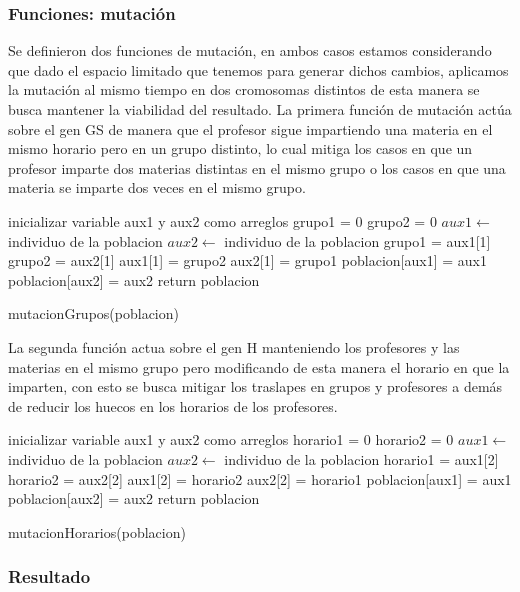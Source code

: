 \subsubsection{Funciones: mutación}

Se definieron dos funciones de mutación, en ambos casos estamos considerando que dado el espacio limitado que tenemos para generar dichos cambios, aplicamos la mutación al mismo tiempo en dos cromosomas distintos de esta manera se busca mantener la viabilidad del resultado. La primera función de mutación  actúa sobre el gen GS de manera que el profesor sigue impartiendo una materia en el mismo horario pero en un grupo distinto, lo cual mitiga los casos en que un profesor imparte dos materias distintas en el mismo grupo o los casos en que una materia se imparte dos veces en el mismo grupo.\\ 


\begin{algorithm}[H]
	\DontPrintSemicolon
	\SetAlgoLined
	inicializar variable aux1 y aux2 como arreglos\;
	grupo1 = 0\;
	grupo2 = 0\;
	$aux1 \leftarrow $ individuo de la poblacion\;
	$aux2 \leftarrow $ individuo de la poblacion\;
	grupo1 = aux1[1]\;
	grupo2 = aux2[1]\;
	aux1[1] = grupo2\;
	aux2[1] = grupo1\;
	poblacion[aux1] = aux1\;
	poblacion[aux2] = aux2\;
	return poblacion \;
	\caption{mutacionGrupos(poblacion)}
\end{algorithm}

La segunda función actua sobre el gen H manteniendo los profesores y las materias en el mismo grupo pero modificando de esta manera el horario en que la imparten, con esto se busca mitigar los traslapes en grupos y profesores a demás de reducir los huecos en los horarios de los profesores.\\

\begin{algorithm}[H]
	\DontPrintSemicolon
	\SetAlgoLined
	inicializar variable aux1 y aux2 como arreglos\;
	horario1 = 0\;
	horario2 = 0\;
	$aux1 \leftarrow $ individuo de la poblacion\;
	$aux2 \leftarrow $ individuo de la poblacion\;
	horario1 = aux1[2]\;
	horario2 = aux2[2]\;
	aux1[2] = horario2\;
	aux2[2] = horario1\;
	poblacion[aux1] = aux1\;
	poblacion[aux2] = aux2\;
	return poblacion \;
	\caption{mutacionHorarios(poblacion)}
	\end{algorithm}  

\subsubsection{Resultado}

